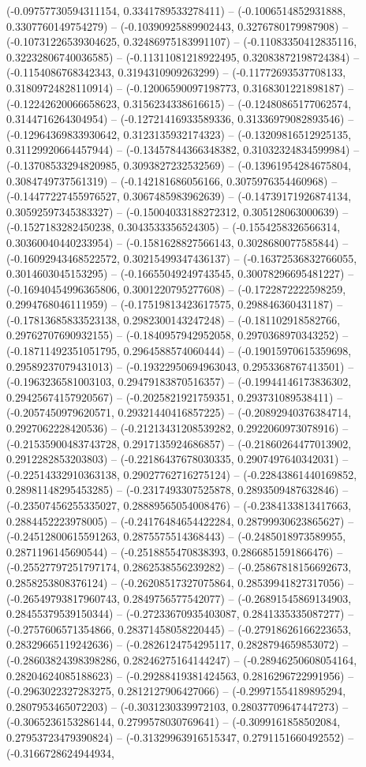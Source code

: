 (-0.09757730594311154, 0.3341789533278411) -- (-0.1006514852931888, 0.3307760149754279) -- (-0.10390925889902443, 0.3276780179987908) -- (-0.10731226539304625, 0.32486975183991107) -- (-0.11083350412835116, 0.32232806740036585) -- (-0.11311081218922495, 0.32083872198724384) -- (-0.1154086768342343, 0.3194310909263299) -- (-0.11772693537708133, 0.31809724828110914) -- (-0.12006590097198773, 0.3168301221898187) -- (-0.12242620066658623, 0.3156234338616615) -- (-0.12480865177062574, 0.3144716264304954) -- (-0.12721416933589336, 0.31336979082893546) -- (-0.12964369833930642, 0.3123135932174323) -- (-0.13209816512925135, 0.31129920664457944) -- (-0.13457844366348382, 0.31032324834599984) -- (-0.13708533294820985, 0.3093827232532569) -- (-0.13961954284675804, 0.3084749737561319) -- (-0.142181686056166, 0.3075976354460968) -- (-0.14477227455976527, 0.3067485983962639) -- (-0.14739171926874134, 0.30592597345383327) -- (-0.15004033188272312, 0.305128063000639) -- (-0.1527183282450238, 0.3043533356524305) -- (-0.1554258326566314, 0.30360040440233954) -- (-0.1581628827566143, 0.3028680077585844) -- (-0.16092943468522572, 0.30215499347436137) -- (-0.16372536832766055, 0.3014603045153295) -- (-0.16655049249743545, 0.30078296695481227) -- (-0.16940454996365806, 0.3001220795277608) -- (-0.1722872222598259, 0.2994768046111959) -- (-0.17519813423617575, 0.298846360431187) -- (-0.17813685833523138, 0.2982300143247248) -- (-0.181102918582766, 0.29762707690932155) -- (-0.1840957942952058, 0.2970368970343252) -- (-0.18711492351051795, 0.2964588574060444) -- (-0.19015970615359698, 0.29589237079431013) -- (-0.19322950694963043, 0.2953368767413501) -- (-0.1963236581003103, 0.29479183870516357) -- (-0.19944146173836302, 0.29425674157920567) -- (-0.2025821921759351, 0.293731089538411) -- (-0.2057450979620571, 0.29321440416857225) -- (-0.20892940376384714, 0.2927062228420536) -- (-0.21213431208539282, 0.2922060973078916) -- (-0.21535900483743728, 0.2917135924686857) -- (-0.21860264477013902, 0.2912282853203803) -- (-0.22186437678030335, 0.2907497640342031) -- (-0.22514332910363138, 0.29027762716275124) -- (-0.22843861440169852, 0.28981148295453285) -- (-0.2317493307525878, 0.2893509487632846) -- (-0.23507456255335027, 0.28889565054008476) -- (-0.2384133813417663, 0.2884452223978005) -- (-0.24176484654422284, 0.28799930623865627) -- (-0.24512800615591263, 0.2875575514368443) -- (-0.2485018973589955, 0.2871196145690544) -- (-0.2518855470838393, 0.2866851591866476) -- (-0.25527797251797174, 0.2862538556239282) -- (-0.25867818156692673, 0.2858253808376124) -- (-0.26208517327075864, 0.28539941827317056) -- (-0.26549793817960743, 0.2849756577542077) -- (-0.26891545869134903, 0.28455379539150344) -- (-0.27233670935403087, 0.2841335335087277) -- (-0.2757606571354866, 0.28371458058220445) -- (-0.27918626166223653, 0.28329665119242636) -- (-0.2826124754295117, 0.2828794659853072) -- (-0.28603824398398286, 0.28246275164144247) -- (-0.28946250608054164, 0.28204624085188623) -- (-0.29288419381424563, 0.2816296722991956) -- (-0.2963022327283275, 0.2812127906427066) -- (-0.29971554189895294, 0.2807953465072203) -- (-0.3031230339972103, 0.28037709647447273) -- (-0.3065236153286144, 0.2799578030769641) -- (-0.3099161858502084, 0.27953723479390824) -- (-0.31329963916515347, 0.2791151660492552) -- (-0.3166728624944934, 